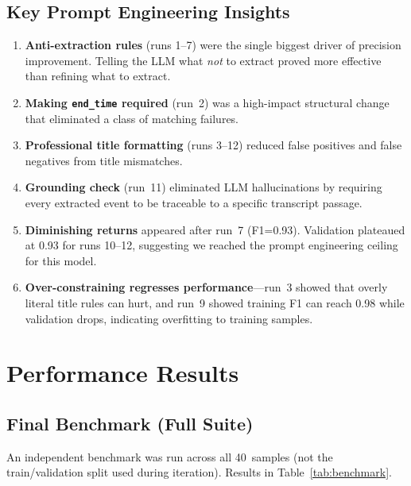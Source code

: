 \documentclass[12pt]{article}
\begin{document}
\subsection{Key Prompt Engineering Insights}

\begin{enumerate}
    \item \textbf{Anti-extraction rules} (runs 1--7) were the single
          biggest driver of precision improvement. Telling the LLM what
          \emph{not} to extract proved more effective than refining what
          to extract.
    \item \textbf{Making \texttt{end\_time} required} (run~2) was a
          high-impact structural change that eliminated a class of matching
          failures.
    \item \textbf{Professional title formatting} (runs 3--12) reduced
          false positives and false negatives from title mismatches.
    \item \textbf{Grounding check} (run~11) eliminated LLM hallucinations
          by requiring every extracted event to be traceable to a specific
          transcript passage.
    \item \textbf{Diminishing returns} appeared after run~7 (F1=0.93).
          Validation plateaued at 0.93 for runs 10--12, suggesting we
          reached the prompt engineering ceiling for this model.
    \item \textbf{Over-constraining regresses performance}---run~3 showed
          that overly literal title rules can hurt, and run~9 showed
          training F1 can reach 0.98 while validation drops, indicating
          overfitting to training samples.
\end{enumerate}

\section{Performance Results}

\subsection{Final Benchmark (Full Suite)}

An independent benchmark was run across all 40~samples (not the
train/validation split used during iteration). Results in
Table~\ref{tab:benchmark}.
\end{document}
